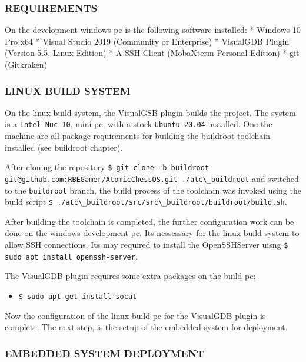 \documentclass[
  english,
  paper=a4,
  ,captions=tableheading
]{scrartcl}
\newcommand{\passthrough}[1]{#1}
\providecommand{\tightlist}{%
  \setlength{\itemsep}{0pt}\setlength{\parskip}{0pt}}
\begin{document}
\hypertarget{requirements-1}{%
\subsubsection{REQUIREMENTS}\label{requirements-1}}

On the development windows pc is the following software installed: *
Windows 10 Pro x64 * Visual Studio 2019 (Community or Enterprise) *
VisualGDB Plugin (Version 5.5, Linux Edition) * A SSH Client (MobaXterm
Personal Edition) * git (Gitkraken)

\hypertarget{linux-build-system}{%
\subsubsection{LINUX BUILD SYSTEM}\label{linux-build-system}}

On the linux build system, the VisualGSB plugin builds the project. The
system is a \passthrough{\lstinline!Intel Nuc 10!}, mini pc, with a
stock \passthrough{\lstinline!Ubuntu 20.04!} installed. One the machine
are all package requirements for building the buildroot toolchain
installed (see buildroot chapter).

After cloning the repository
\passthrough{\lstinline!$ git clone -b buildroot git@github.com:RBEGamer/AtomicChessOS.git ./atc\_buildroot!}
and switched to the \passthrough{\lstinline!buildroot!} branch, the
build process of the toolchain was invoked using the build script
\passthrough{\lstinline!$ ./atc\_buildroot/src/src\_buildroot/buildroot/build.sh!}.

After building the toolchain is completed, the further configuration
work can be done on the windows development pc. Its nessessary for the
linux build system to allow SSH connections. Its may required to install
the OpenSSHServer uisng
\passthrough{\lstinline!$ sudo apt install openssh-server!}.

The VisualGDB plugin requires some extra packages on the build pc:

\begin{itemize}
\tightlist
\item
  \passthrough{\lstinline!$ sudo apt-get install socat!}
\end{itemize}

Now the configuration of the linux build pc for the VisualGDB plugin is
complete. The next step, is the setup of the embedded system for
deployment.

\hypertarget{embedded-system-deployment}{%
\subsubsection{EMBEDDED SYSTEM
DEPLOYMENT}\label{embedded-system-deployment}}
\end{document}
